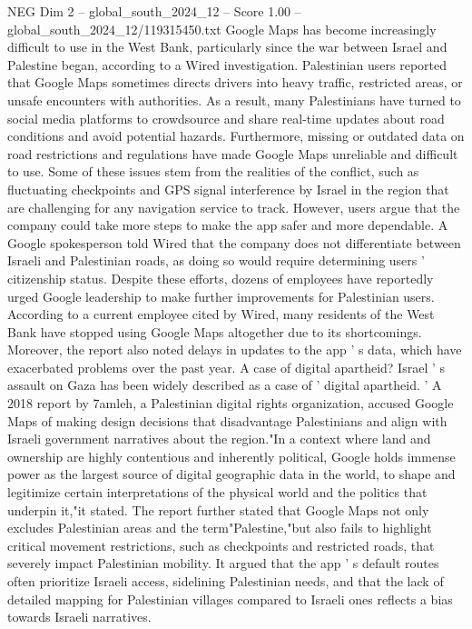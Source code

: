 \begin{textsample}{NEG Dim 2 – global\_south\_2024\_12 – Score 1.00 – global\_south\_2024\_12/119315450.txt}  \label{ex:f2_neg_236}
Google Maps has become increasingly difficult to use in the West Bank, particularly since the war between Israel and Palestine began, according to a Wired investigation.
Palestinian users reported that Google Maps sometimes directs drivers into heavy traffic, restricted areas, or unsafe encounters with authorities.
As a result, many Palestinians have turned to social media platforms to crowdsource and share real-time updates about road conditions and avoid potential hazards.
Furthermore, missing or outdated data on road restrictions and regulations have made Google Maps unreliable and difficult to use.
Some of these issues stem from the realities of the conflict, such as fluctuating checkpoints and GPS signal interference by Israel in the region that are challenging for any navigation service to track.
However, users argue that the company could take more steps to make the app safer and more dependable.
A Google spokesperson told Wired that the company does not differentiate between Israeli and Palestinian roads, as doing so would require determining users ' citizenship status.
Despite these efforts, dozens of employees have reportedly urged Google leadership to make further improvements for Palestinian users.
According to a current employee cited by Wired, many residents of the West Bank have stopped using Google Maps altogether due to its shortcomings.
Moreover, the report also noted delays in updates to the app ' s data, which have exacerbated problems over the past year.
A case of digital apartheid?
Israel ' s assault on Gaza has been widely described as a case of ' digital apartheid. ' A 2018 report by 7amleh, a Palestinian digital rights organization, accused Google Maps of making design decisions that disadvantage Palestinians and align with Israeli government narratives about the region."In a context where land and ownership are highly contentious and inherently political, Google holds immense power as the largest source of digital geographic data in the world, to shape and legitimize certain interpretations of the physical world and the politics that underpin it,"it stated.
The report further stated that Google Maps not only excludes Palestinian areas and the term"Palestine,"but also fails to highlight critical movement restrictions, such as checkpoints and restricted roads, that severely impact Palestinian mobility.
It argued that the app ' s default routes often prioritize Israeli access, sidelining Palestinian needs, and that the lack of detailed mapping for Palestinian villages compared to Israeli ones reflects a bias towards Israeli narratives.

\end{textsample}

